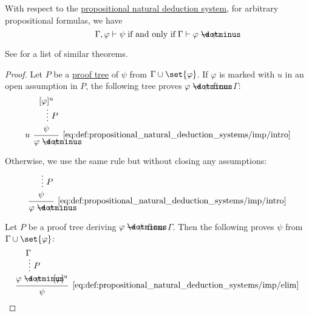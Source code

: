 \begin{theorem}\label{thm:propositional_syntactic_deduction_theorem}
  With respect to the \hyperref[def:propositional_natural_deduction_system]{propositional natural deduction system}, for arbitrary propositional formulas, we have
  \begin{equation*}
    \Gamma, \varphi \vdash \psi \T{if and only if} \Gamma \vdash \varphi \synimplies \psi.
  \end{equation*}
\end{theorem}
\begin{comments}
  \item See  for a list of similar theorems.
\end{comments}
\begin{proof}
  \SufficiencySubProof Let \( P \) be a \hyperref[def:natural_deduction_proof_tree]{proof tree} of \( \psi \) from \( \Gamma \cup \set{ \varphi } \). If \( \varphi \) is marked with \( u \) in an open assumption in \( P \), the following tree proves \( \varphi \synimplies \psi \) from \( \Gamma \):
  \begin{equation*}
    \begin{prooftree}
      \hypo{ [\varphi]^u }
      \ellipsis { \( P \) } { \psi }
      \infer[left label=\( u \)]1[\ref{eq:def:propositional_natural_deduction_systems/imp/intro}]{ \varphi \synimplies \psi }
    \end{prooftree}
  \end{equation*}

  Otherwise, we use the same rule but without closing any assumptions:
  \begin{equation*}
    \begin{prooftree}
      \hypo{}
      \ellipsis { \( P \) } { \psi }
      \infer1[\ref{eq:def:propositional_natural_deduction_systems/imp/intro}]{ \varphi \synimplies \psi }
    \end{prooftree}
  \end{equation*}

  \NecessitySubProof Let \( P \) be a proof tree deriving \( \varphi \synimplies \psi \) from \( \Gamma \). Then the following proves \( \psi \) from \( \Gamma \cup \set{ \varphi } \):
  \begin{equation*}
    \begin{prooftree}
      \hypo {\Gamma}
      \ellipsis { \( P \) } { \varphi \synimplies \psi }

      \hypo { [\varphi]^u }
      \infer2[\ref{eq:def:propositional_natural_deduction_systems/imp/elim}]{ \psi }
    \end{prooftree}
  \end{equation*}
\end{proof}

